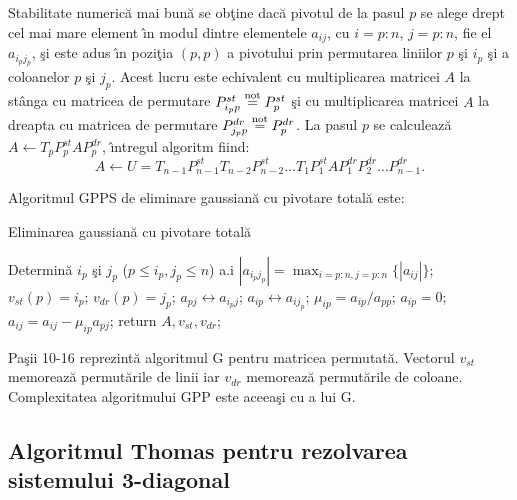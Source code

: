 \documentclass{exam}
\begin{document}
\par Stabilitate numeric\u{a} mai bun\u{a} se ob\c{t}ine dac\u{a} pivotul de la
pasul $p$ se alege drept cel mai mare element \^{\i}n modul dintre
elementele $a_{ij}$, cu $i=p:n$, $j=p:n$, fie el $a_{i_p j_p}$, \c{s}i este adus \^{\i}n pozi\c{t}ia $(p,p)$ a pivotului prin permutarea liniilor $p$ \c{s}i $i_p$ \c{s}i a coloanelor $p$ \c{s}i $j_p$. Acest lucru este echivalent cu multiplicarea matricei $A$ la st\^{a}nga cu matricea de permutare $P^{st}_{i_p p}\stackrel{\rm not}{=}P^{st}_p$ \c{s}i cu multiplicarea matricei $A$ la dreapta cu matricea de permutare $P^{dr}_{j_p p}\stackrel{\rm not}{=}P^{dr}_p$. La pasul $p$ se calculeaz\u{a} $A \leftarrow T_p P^{st}_p A P^{dr}_p$, \^{\i}ntregul algoritm fiind:
$$A \leftarrow U = T_{n-1} P^{st}_{n-1} T_{n-2} P^{st}_{n-2} \ldots T_1 P^{st}_1 A P^{dr}_1 P^{dr}_2 \ldots P^{dr}_{n-1}.$$

Algoritmul GPPS de eliminare gaussian\u{a} cu pivotare  total\u{a}  este:

\begin{algorithm} [H]
	\caption{Eliminarea gaussian\u{a} cu pivotare total\u{a}}
	\label{gpt}
	\begin{algorithmic}[1]
		\State Determin\u{a} $i_p$ \c{s}i $j_p$ ($p \leq i_p, j_p \leq n$) a.i $|a_{i_p j_p}|=\max_{i=p:n, j=p:n}{\{|a_{ij}|\}}$; $v_{st}(p) = i_p$; $v_{dr}(p) = j_p$;
		\State $a_{pj} \leftrightarrow a_{i_p j}$;
		\EndFor
		\State $a_{ip} \leftrightarrow a_{i j_p}$;
		\EndFor
		\State $\mu_{ip} = a_{ip}/a_{pp}$;
		\State $a_{ip} = 0$;
		\State $a_{ij} = a_{ij} - \mu_{ip} a_{pj}$;
		\EndFor
		\EndFor
		\EndFor
		\State return $A, v_{st}, v_{dr}$;
		\EndProcedure
	\end{algorithmic}
\end{algorithm}

\par Pa\c{s}ii 10-16 reprezint\u{a} algoritmul G pentru matricea permutat\u{a}. Vectorul $v_{st}$ memoreaz\u{a} permut\u{a}rile de linii iar $v_{dr}$ memoreaz\u{a} permut\u{a}rile de coloane. Complexitatea algoritmului GPP este aceea\c{s}i cu a lui G.

\subsection{Algoritmul Thomas pentru rezolvarea sistemului 3-diagonal}
\end{document}

